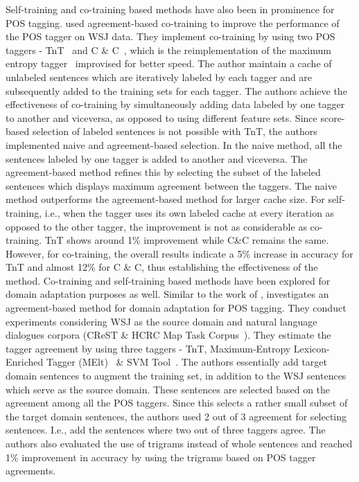 Self-training and co-training based methods have also been in prominence for POS tagging. \cite{clark:curran:ea:03} used agreement-based co-training to improve the performance of the POS tagger on WSJ data. They implement co-training by using two POS taggers - TnT~\citep{brants:00.2} and C \& C~\citep{curran2007linguistically}, which is the reimplementation of the maximum entropy tagger~\citep{ratnaparkhi1996maximum} improvised for better speed. The author maintain a cache of unlabeled sentences which are iteratively labeled by each tagger and are subsequently added to the training sets for each tagger. The authors achieve the effectiveness of co-training by simultaneously adding data labeled by one tagger to another and viceversa, as opposed to using different feature sets. Since score-based selection of labeled sentences is not possible with TnT, the authors implemented naive and agreement-based selection. In the naive method, all the sentences labeled by one tagger is added to another and viceversa. The agreement-based method refines this by selecting the subset of the labeled sentences which displays maximum agreement between the taggers. The naive method outperforms the agreement-based method for larger cache size. For self-training, i.e., when the tagger uses its own labeled cache at every iteration as opposed to the other tagger, the improvement is not as considerable as co-training. TnT shows around 1\% improvement while C\&C remains the same. However, for co-training, the overall results indicate a 5\% increase in accuracy for TnT and almost 12\% for C \& C, thus establishing the effectiveness of the method. Co-training and self-training based methods have been explored for domain adaptation purposes as well. Similar to the work of \cite{clark:curran:ea:03}, \cite{kuebler:baucom:11} investigates an agreement-based method for domain adaptation for POS tagging. They conduct experiments considering WSJ as the source domain and natural language dialogues corpora (CReST \& HCRC Map Task Corpus~\citep{anderson1991hcrc}). They estimate the tagger agreement by using three taggers - TnT, Maximum-Entropy Lexicon-Enriched Tagger (MElt)~\citep{denis2009coupling} \& SVM Tool~\citep{gimenez2004svmtool}. The authors essentially add target domain sentences to augment the training set, in addition to the WSJ sentences which serve as the source domain. These sentences are selected based on the agreement among all the POS taggers. Since this selects a rather small subset of the target domain sentences, the authors used 2 out of 3 agreement for selecting sentences. I.e., add the sentences where two out of three taggers agree. The authors also evaluated the use of trigrams instead of whole sentences and reached 1\% improvement in accuracy by using the trigrams based on POS tagger agreements. 

